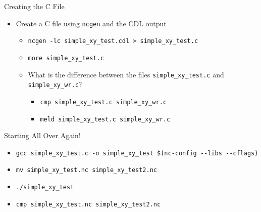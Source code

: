 \documentclass[compress,11pt,xcolor=svgnames,aspectratio=169]{beamer}
\begin{document}
\begin{frame}[fragile]{Creating the C File}

\begin{itemize}
\setlength\itemsep{0.4cm}

  \item Create a C file using \texttt{ncgen} and the CDL output\\[0.4cm]

  \begin{itemize}
  \setlength\itemsep{0.5cm}

    \item \verb|ncgen -lc simple_xy_test.cdl > simple_xy_test.c|
    \item \verb|more simple_xy_test.c|
    \item What is the difference between the files \verb|simple_xy_test.c| and \verb|simple_xy_wr.c|?

    \begin{itemize}
      \item \verb|cmp simple_xy_test.c simple_xy_wr.c|
      \item \verb|meld simple_xy_test.c simple_xy_wr.c|
    \end{itemize}

  \end{itemize}

\end{itemize}

\end{frame}

\begin{frame}[fragile]{Starting All Over Again!}

\begin{itemize}
  \setlength\itemsep{0.5cm}

  \item \verb|gcc simple_xy_test.c -o simple_xy_test $(nc-config --libs --cflags)|\\
  \item \verb|mv simple_xy_test.nc simple_xy_test2.nc|
  \item \verb|./simple_xy_test|
  \item \verb|cmp simple_xy_test.nc simple_xy_test2.nc|

\end{itemize}

\end{frame}
\end{document}
